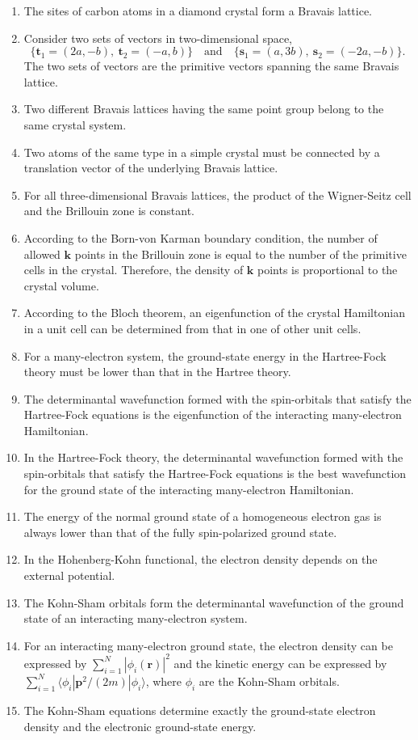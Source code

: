 \begin{enumerate}[label=(\alph*)]
\item The sites of carbon atoms in a diamond crystal form a Bravais lattice.
\item Consider two sets of vectors in two-dimensional space,
\[
\{\mathbf t_1=(2a,-b),\ \mathbf t_2=(-a,b)\}\quad\text{and}\quad
\{\mathbf s_1=(a,3b),\ \mathbf s_2=(-2a,-b)\}.
\]
The two sets of vectors are the primitive vectors spanning the same Bravais lattice.
\item Two different Bravais lattices having the same point group belong to the same crystal system.
\item Two atoms of the same type in a simple crystal must be connected by a translation vector of the underlying Bravais lattice.
\item For all three-dimensional Bravais lattices, the product of the Wigner-Seitz cell and the Brillouin zone is constant.
\item According to the Born-von Karman boundary condition, the number of allowed $\mathbf k$ points in the Brillouin zone is equal to the number of the primitive cells in the crystal. Therefore, the density of $\mathbf k$ points is proportional to the crystal volume.
\item According to the Bloch theorem, an eigenfunction of the crystal Hamiltonian in a unit cell can be determined from that in one of other unit cells.
\item For a many-electron system, the ground-state energy in the Hartree-Fock theory must be lower than that in the Hartree theory.
\item The determinantal wavefunction formed with the spin-orbitals that satisfy the Hartree-Fock equations is the eigenfunction of the interacting many-electron Hamiltonian.
\item In the Hartree-Fock theory, the determinantal wavefunction formed with the spin-orbitals that satisfy the Hartree-Fock equations is the best wavefunction for the ground state of the interacting many-electron Hamiltonian.
\item The energy of the normal ground state of a homogeneous electron gas is always lower than that of the fully spin-polarized ground state.
\item In the Hohenberg-Kohn functional, the electron density depends on the external potential.
\item The Kohn-Sham orbitals form the determinantal wavefunction of the ground state of an interacting many-electron system.
\item For an interacting many-electron ground state, the electron density can be expressed by $\sum_{i=1}^N|\phi_i(\mathbf r)|^2$ and the kinetic energy can be expressed by $\sum_{i=1}^N\langle\phi_i|\mathbf p^2/(2m)|\phi_i\rangle$, where $\phi_i$ are the Kohn-Sham orbitals.
\item The Kohn-Sham equations determine exactly the ground-state electron density and the electronic ground-state energy.
\end{enumerate}

